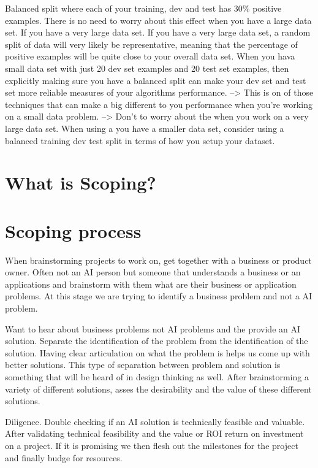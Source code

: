 Balanced split where each of your training, dev and test has 30\% positive examples.
There is no need to worry about this effect when you have a large data set.
If you have a very large data set.
If you have a very large data set, a random split of data will very likely be representative, meaning that the percentage of positive examples will be quite close to your overall data set.
When you hava small data set with just 20 dev set examples and 20 test set examples, then explicitly making sure you have a balanced split can make your dev set and test set more reliable measures of your algorithms performance.
--> This is on of those techniques that can make a big different to you performance when you're working on a small data problem.
--> Don't to worry about the when you work on a very large data set.
When using a you have a smaller data set, consider using a balanced training dev test split in terms of how you setup your dataset.

\section{What is Scoping?}

\section{Scoping process}

When brainstorming projects to work on, get together with a business or product owner.
Often not an AI person but someone that understands a business or an applications and brainstorm with them what are their business or application problems.
At this stage we are trying to identify a business problem and not a AI problem.

Want to hear about business problems not AI problems and the provide an AI solution.
Separate the identification of the problem from the identification of the solution.
Having clear articulation on what the problem is helps us come up with better solutions.
This type of separation between problem and solution is something that will be heard of in design thinking as well.
After brainstorming a variety of different solutions, asses the desirability and the value of these different solutions.

Diligence.
Double checking if an AI solution is technically feasible and valuable.
After validating technical feasibility and the value or ROI return on investment on a project.
If it is promising we then flesh out the milestones for the project and finally budge for resources.

